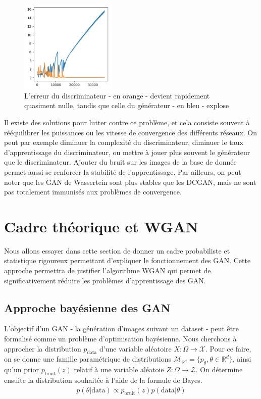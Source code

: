 \begin{figure}[!h]
\centering

\includegraphics[width=130pt]{"images/GAN/failure3"}
\caption{L'erreur du discriminateur - en orange - devient rapidement quasiment nulle, tandis que celle du générateur - en bleu - explose}
\label{perte_eq}
\end{figure}


Il existe des solutions pour lutter contre ce problème, et cela consiste souvent à rééquilibrer les puissances ou les vitesse de convergence des différents réseaux. On peut par exemple diminuer la complexité du discriminateur, diminuer le taux d'apprentissage du discriminateur, ou mettre à jouer plus souvent le générateur que le discriminateur.
Ajouter du bruit sur les images de la base de donnée permet aussi se renforcer la stabilité de l'apprentissage. Par ailleurs, on peut noter que les GAN de Wassertein sont plus stables que les DCGAN, mais ne sont pas totalement immunisés aux problèmes de convergence.

\section{Cadre théorique et WGAN}
Nous allons essayer dans cette section de donner un cadre probabiliste et statistique rigoureux permettant d'expliquer le fonctionnement des GAN. Cette approche permettra de justifier l'algorithme WGAN qui permet de significativement réduire les problèmes d'apprentissage des GAN.

\subsection{Approche bayésienne des GAN}
L'objectif d'un GAN - la génération d'images suivant un dataset - peut être formalisé comme un problème d'optimisation bayésienne. Nous cherchons à approcher la distribution $p_{\mathrm{data}}$ d'une variable aléatoire $X: \Omega \longrightarrow \mathcal{X}$. Pour ce faire, on se donne une famille paramétrique de distributions $\mathcal{M}_{\mathbb{R}^{d}} = \{p_{\theta}, \theta \in \mathbb{R}^d\}$, ainsi qu'un prior $p_{\mathrm{bruit}}(z)$ relatif à une variable aléatoie $Z : \Omega \longrightarrow \mathcal{Z}$. On détermine ensuite la distribution souhaitée à l'aide de la formule de Bayes. $$\begin{aligned} p(\theta | \mathrm{data}) \propto p_{\mathrm{bruit}}(z)p(\mathrm{data}|\theta)\end{aligned}$$

